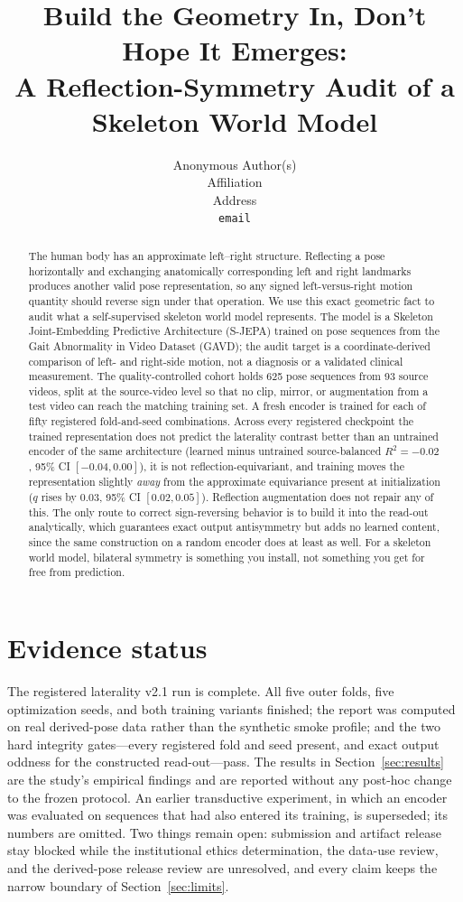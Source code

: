 \documentclass{article}
\title{Build the Geometry In, Don't Hope It Emerges:\\ A Reflection-Symmetry Audit of a Skeleton World Model}
\author{%
  Anonymous Author(s)\\
  Affiliation\\
  Address\\
  \texttt{email}\\
}
\begin{document}
\maketitle

\begin{abstract}
The human body has an approximate left--right structure. Reflecting a pose horizontally and exchanging anatomically corresponding left and right landmarks produces another valid pose representation, so any signed left-versus-right motion quantity should reverse sign under that operation. We use this exact geometric fact to audit what a self-supervised skeleton world model represents. The model is a Skeleton Joint-Embedding Predictive Architecture (S-JEPA) trained on pose sequences from the Gait Abnormality in Video Dataset (GAVD); the audit target is a coordinate-derived comparison of left- and right-side motion, not a diagnosis or a validated clinical measurement. The quality-controlled cohort holds 625 pose sequences from 93 source videos, split at the source-video level so that no clip, mirror, or augmentation from a test video can reach the matching training set. A fresh encoder is trained for each of fifty registered fold-and-seed combinations. Across every registered checkpoint the trained representation does not predict the laterality contrast better than an untrained encoder of the same architecture (learned minus untrained source-balanced $R^2 = -0.02$, 95\% CI $[-0.04, 0.00]$), it is not reflection-equivariant, and training moves the representation slightly \emph{away} from the approximate equivariance present at initialization ($q$ rises by $0.03$, 95\% CI $[0.02, 0.05]$). Reflection augmentation does not repair any of this. The only route to correct sign-reversing behavior is to build it into the read-out analytically, which guarantees exact output antisymmetry but adds no learned content, since the same construction on a random encoder does at least as well. For a skeleton world model, bilateral symmetry is something you install, not something you get for free from prediction.
\end{abstract}

\section{Evidence status}

The registered laterality v2.1 run is complete. All five outer folds, five optimization seeds, and both training variants finished; the report was computed on real derived-pose data rather than the synthetic smoke profile; and the two hard integrity gates---every registered fold and seed present, and exact output oddness for the constructed read-out---pass. The results in Section~\ref{sec:results} are the study's empirical findings and are reported without any post-hoc change to the frozen protocol. An earlier transductive experiment, in which an encoder was evaluated on sequences that had also entered its training, is superseded; its numbers are omitted. Two things remain open: submission and artifact release stay blocked while the institutional ethics determination, the data-use review, and the derived-pose release review are unresolved, and every claim keeps the narrow boundary of Section~\ref{sec:limits}.
\end{document}
